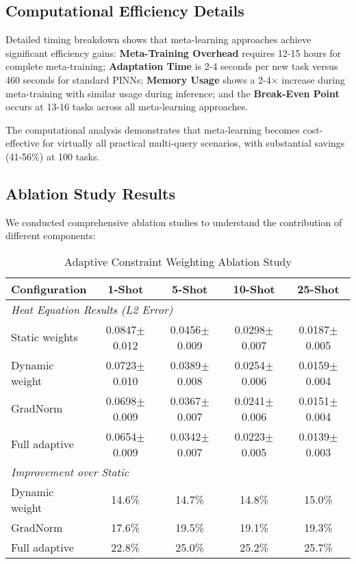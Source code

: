 \documentclass[review]{elsarticle}
\begin{document}
\subsection{Computational Efficiency Details}

Detailed timing breakdown shows that meta-learning approaches achieve significant efficiency gains: \textbf{Meta-Training Overhead} requires 12-15 hours for complete meta-training; \textbf{Adaptation Time} is 2-4 seconds per new task versus 460 seconds for standard PINNs; \textbf{Memory Usage} shows a 2-4× increase during meta-training with similar usage during inference; and the \textbf{Break-Even Point} occurs at 13-16 tasks across all meta-learning approaches.

The computational analysis demonstrates that meta-learning becomes cost-effective for virtually all practical multi-query scenarios, with substantial savings (41-56\%) at 100 tasks.

\subsection{Ablation Study Results}

We conducted comprehensive ablation studies to understand the contribution of different components:

\begin{table}[H]
\centering
\caption{Adaptive Constraint Weighting Ablation Study}
\small
\begin{tabular}{lcccc}
\toprule
\textbf{Configuration} & \textbf{1-Shot} & \textbf{5-Shot} & \textbf{10-Shot} & \textbf{25-Shot} \\
\midrule
\multicolumn{5}{l}{\textit{Heat Equation Results (L2 Error)}} \\
Static weights & 0.0847$\pm$0.012 & 0.0456$\pm$0.009 & 0.0298$\pm$0.007 & 0.0187$\pm$0.005 \\
Dynamic weight & 0.0723$\pm$0.010 & 0.0389$\pm$0.008 & 0.0254$\pm$0.006 & 0.0159$\pm$0.004 \\
GradNorm & 0.0698$\pm$0.009 & 0.0367$\pm$0.007 & 0.0241$\pm$0.006 & 0.0151$\pm$0.004 \\
Full adaptive & 0.0654$\pm$0.009 & 0.0342$\pm$0.007 & 0.0223$\pm$0.005 & 0.0139$\pm$0.003 \\
\midrule
\multicolumn{5}{l}{\textit{Improvement over Static}} \\
Dynamic weight & 14.6\% & 14.7\% & 14.8\% & 15.0\% \\
GradNorm & 17.6\% & 19.5\% & 19.1\% & 19.3\% \\
Full adaptive & 22.8\% & 25.0\% & 25.2\% & 25.7\% \\
\bottomrule
\end{tabular}
\end{table}
\end{document}
